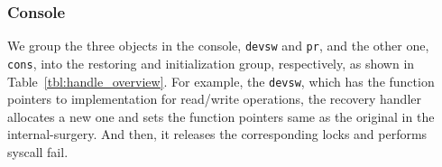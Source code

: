 \subsubsection{Console}
\label{subsec:recoveryhandlerCons}
We group the three objects in the console, \texttt{devsw} and \texttt{pr}, and the other one, \texttt{cons}, into the restoring and initialization group, respectively, as shown in Table~\ref{tbl:handle_overview}. For example, the \texttt{devsw}, which has the function pointers to implementation for read/write operations, the recovery handler allocates a new one and sets the function pointers same as the original in the internal-surgery. And then, it releases the corresponding locks and performs syscall fail.



